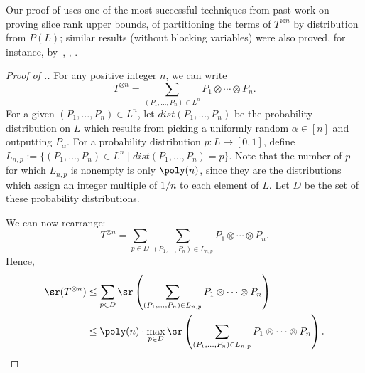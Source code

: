 \documentclass{toc}
\begin{document}
Our proof of  uses one of the most successful techniques from past work on proving slice rank upper bounds, of partitioning the terms of $T^{\otimes n}$ by distribution from $P(L)$; similar results (without blocking variables) were also proved, for instance, by~\cite[Proposition~6]{tao2}, \cite[Theorem~5.2]{aw}, \cite[Theorem~5.9]{quantum}.

\begin{proof}[Proof of .]
For any positive integer $n$, we can write
$$T^{\otimes n} = \sum_{(P_1, \ldots, P_n) \in L^n} P_1 \otimes \cdots \otimes P_n.$$
For a given $(P_1, \ldots, P_n) \in L^n$, let $dist(P_1, \ldots, P_n)$ be the probability distribution on $L$ which results from picking a uniformly random $\alpha \in [n]$ and outputting $P_\alpha$. For a probability distribution $p : L \to [0,1]$, define $L_{n,p} := \{ (P_1, \ldots, P_n) \in L^n \mid dist(P_1, \ldots, P_n) = p  \}$. Note that the number of $p$ for which $L_{n,p}$ is nonempty is only $\poly(n)$, since they are the distributions which assign an integer multiple of $1/n$ to each element of $L$. Let $D$ be the set of these probability distributions.

We can now rearrange:
$$T^{\otimes n} = \sum_{p \in D} \sum_{(P_1, \ldots, P_n) \in L_{n,p}}P_1 \otimes \cdots \otimes P_n.$$
Hence,
\begin{align*}
    \sr(T^{\otimes n}) &\leq \sum_{p \in D} \sr\left( \sum_{(P_1, \ldots, P_n) \in L_{n,p}}P_1 \otimes \cdots \otimes P_n \right) \\ &\leq \poly(n) \cdot \max_{p \in D} \sr\left( \sum_{(P_1, \ldots, P_n) \in L_{n,p}}P_1 \otimes \cdots \otimes P_n \right).
\end{align*}


\end{proof}
\end{document}
